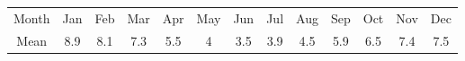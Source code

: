 \begin{tabular}{ccccccccccccc} \toprule
Month & Jan & Feb & Mar & Apr & May & Jun & Jul & Aug & Sep & Oct & Nov & Dec \\
Mean  & 8.9 & 8.1 & 7.3 & 5.5 & 4   & 3.5 & 3.9 & 4.5 & 5.9 & 6.5 & 7.4 & 7.5 \\\bottomrule
\end{tabular}

